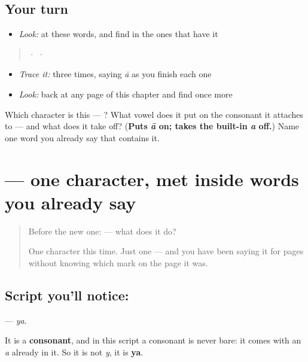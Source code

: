 \subsection*{Your turn}
\begin{itemize}
\raggedright
  \item \emph{Look:} at these words, and find  in the ones that have it
\end{itemize}

\begin{quote}
  ·    ·  
\end{quote}

\begin{itemize}
\raggedright
  \item \emph{Trace it:}  three times, saying \emph{ā} as you finish each one
  \item \emph{Look:} back at any page of this chapter and find  once more
\end{itemize}

\begin{tcolorbox}[breakable,colback=teal!4,colframe=teal!35!black,title={Before you move on}]
Which character is this — ? What vowel does it put on the consonant it attaches to — and what does it take off? (\textbf{Puts \emph{ā} on; takes the built-in \emph{a} off.}) Name one word you already say that contains it.
\end{tcolorbox}
\section[\texorpdfstring{\hi{य} (ya)}{य (ya)}]{ — one character, met inside words you already say}

\label{lesson:HI-S115-letter-ya}



\begin{quote}
Before the new one:  — what does it do?

One character this time. Just one — and you have been saying it for pages without knowing which mark on the page it was.
\end{quote}

\subsection*{Script you'll notice: }
\textbf{} — \emph{ya}.

It is a \textbf{consonant}, and in this script a consonant is never bare: it comes with an \emph{a} already in it. So it is not \emph{y}, it is \textbf{ya}.

